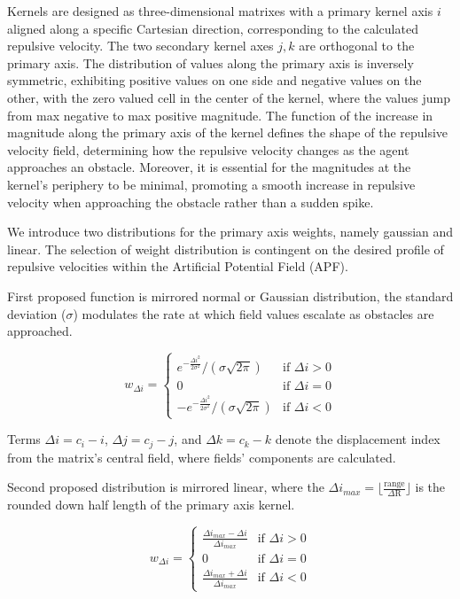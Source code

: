 \documentclass[letterpaper, 10 pt, conference]{ieeeconf}  %
\begin{document}
Kernels are designed as three-dimensional matrixes with a primary kernel axis $i$ aligned along a specific Cartesian direction, corresponding to the calculated repulsive velocity. The two secondary kernel axes $j,k$ are orthogonal to the primary axis. The distribution of values along the primary axis is inversely symmetric, exhibiting positive values on one side and negative values on the other, with the zero valued cell in the center of the kernel, where the values jump from max negative to max positive magnitude. The function of the increase in magnitude along the primary axis of the kernel defines the shape of the repulsive velocity field, determining how the repulsive velocity changes as the agent approaches an obstacle. Moreover, it is essential for the magnitudes at the kernel's periphery to be minimal, promoting a smooth increase in repulsive velocity when approaching the obstacle rather than a sudden spike.

We introduce two distributions for the primary axis weights, namely gaussian and linear. The selection of weight distribution is contingent on the desired profile of repulsive velocities within the Artificial Potential Field (APF).

First proposed function is mirrored normal or Gaussian distribution, the standard deviation (\(\sigma\)) modulates the rate at which field values escalate as obstacles are approached.

\begin{equation}
w_{\Delta i} = 
\begin{cases} 
	e^{-\frac{\Delta i^2}{2\sigma^2}} / (\sigma \sqrt{2\pi}) & \text{if } \Delta i > 0 \\
	0 & \text{if } \Delta i = 0 \\
	-e^{-\frac{\Delta i^2}{2\sigma^2}} / (\sigma \sqrt{2\pi}) & \text{if } \Delta i < 0 
\end{cases}
\end{equation}

Terms \(\Delta i = c_i - i\), \(\Delta j = c_j - j\), and \(\Delta k = c_k - k\) denote the displacement index from the matrix's central field, where fields' components are calculated.

Second proposed distribution is mirrored linear, where the $\Delta i_{max} = \lfloor \frac{\mathrm{range}}{\Delta \mathrm{R}} \rfloor$ is the rounded down half length of the primary axis kernel. 

\begin{equation}
	w_{\Delta i} = 
	\begin{cases} 
	 	\frac{\Delta i_{max} - \Delta i}{\Delta i_{max}} & \text{if } \Delta i > 0 \\
		0 & \text{if } \Delta i = 0 \\
		\frac{\Delta i_{max} + \Delta i}{\Delta i_{max}}& \text{if } \Delta i < 0 
	\end{cases}
\end{equation}
\end{document}
